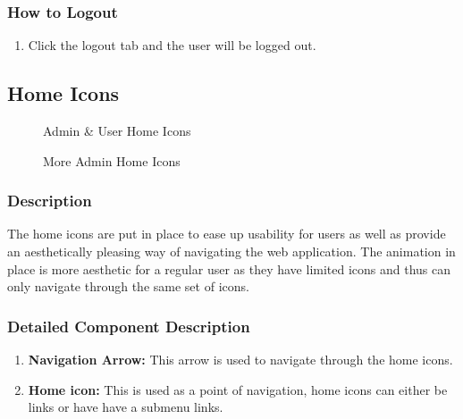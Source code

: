 \documentclass[14pt, a4paper]{article}
\begin{document}
	\subsubsection{How to Logout}
		\begin{enumerate}
			\item Click the logout tab and the user will be logged out.
		\end{enumerate}
\subsection{Home Icons}
	\begin{figure}[H]
		\caption{Admin \& User Home Icons}
  		\label{fig:icons1}
	\end{figure}
	\begin{figure}[H]
		\caption{More Admin Home Icons}
  		\label{fig:icons2}
	\end{figure}
	\subsubsection{Description} The home icons are put in place to ease up usability for users as well as provide an aesthetically pleasing way of navigating the web application. The animation in place is more aesthetic for a regular user as they have limited icons and thus can only navigate through the same set of icons.
	\subsubsection{Detailed Component Description}
		\begin{enumerate}
			\item \textbf{Navigation Arrow:} This arrow is used to navigate through the home icons.
			\item \textbf{Home icon:} This is used as a point of navigation, home icons can either be links or have have a submenu links.
		\end{enumerate}
\end{document}
